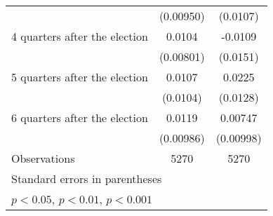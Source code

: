 \begin{table}[htbp]
\begin{tabular}{l*{2}{c}}
                    &   (0.00950)         &    (0.0107)         \\
[1em]
 4 quarters after the election&      0.0104         &     -0.0109         \\
                    &   (0.00801)         &    (0.0151)         \\
[1em]
 5 quarters after the election&      0.0107         &      0.0225         \\
                    &    (0.0104)         &    (0.0128)         \\
[1em]
 6 quarters after the election&      0.0119         &     0.00747         \\
                    &   (0.00986)         &   (0.00998)         \\
\hline
Observations        &        5270         &        5270         \\
\hline\hline
\multicolumn{3}{l}{\footnotesize Standard errors in parentheses}\\
\multicolumn{3}{l}{\footnotesize \sym{*} \(p<0.05\), \sym{**} \(p<0.01\), \sym{***} \(p<0.001\)}\\
\end{tabular}
\end{table}
